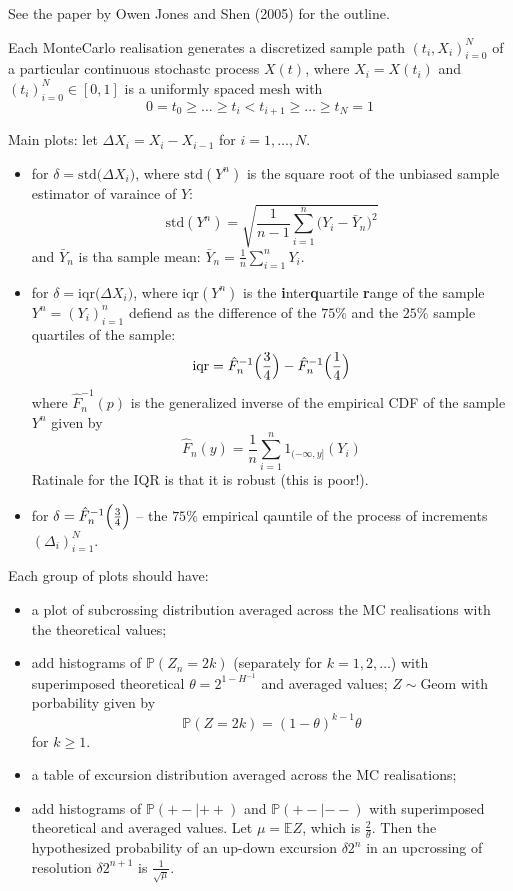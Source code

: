 \documentclass[a4paper]{report}
\newcommand{\pr}{\mathbb{P}}
\newcommand{\ex}{\mathbb{E}}
\begin{document}
See the paper by Owen Jones and Shen (2005) for the outline.

Each MonteCarlo realisation generates a discretized sample path $(t_i, X_i)_{i=0}^N$ of
a particular continuous stochastc process $X(t)$, where $X_i = X(t_i)$ and $(t_i)_{i=0}^N\in [0,1]$
is a uniformly spaced mesh with
\[0 = t_0 \geq \ldots \geq t_i < t_{i+1} \geq \ldots \geq t_N = 1\]

Main plots: let $\Delta X_i = X_i - X_{i-1}$ for $i=1,\ldots, N$.
\begin{itemize}
	\item for $\delta = \text{std}\bigl(\Delta X_i \bigr)$, where $\text{std}(Y^n)$ is
	the square root of the unbiased sample estimator of varaince of $Y$:
	\[ \text{std}(Y^n) = \sqrt{ \frac{1}{n-1} \sum_{i=1}^n \bigl( Y_i - \bar{Y}_n \bigr)^2 }\]
	and $\bar{Y}_n$ is tha sample mean: $\bar{Y}_n = \frac{1}{n}\sum_{i=1}^n Y_i$. 

	\item for $\delta = \text{iqr}\bigl(\Delta X_i \bigr)$, where $\text{iqr}(Y^n)$ is
	the \textbf{i}nter\textbf{q}uartile \textbf{r}ange of the sample $Y^n = (Y_i)_{i=1}^n$
	defiend as the difference of the $75\%$ and the $25\%$ sample quartiles of the sample:
	\[\text{iqr} = \hat{F}^{-1}_n\Bigl(\frac{3}{4}\Bigr) - \hat{F}^{-1}_n\Bigl(\frac{1}{4}\Bigr)\]
	where $\hat{F}^{-1}_n(p)$ is the generalized inverse of the empirical CDF of the sample $Y^n$
	given by
	\[\hat{F}_n(y) = \frac{1}{n} \sum_{i=1}^n 1_{(-\infty,y]}(Y_i)\]
	Ratinale for the IQR is that it is robust (this is poor!).
	\item for $\delta = \hat{F}^{-1}_n\Bigl(\frac{3}{4}\Bigr)$ -- the $75\%$ empirical qauntile of
	the process of increments $(\Delta_i)_{i=1}^N$.
\end{itemize}

Each group of plots should have: \begin{itemize}
	\item a plot of subcrossing distribution averaged across the MC realisations with
	the theoretical values;
	\item add histograms of $\pr(Z_n = 2k)$ (separately for $k=1,2,\ldots$) with
	superimposed theoretical $\theta = 2^{1-H^{-1}}$ and averaged values;
	$Z\sim\text{Geom}$ with porbability given by
	\[\pr(Z = 2k) = (1-\theta)^{k-1} \theta\]
	for $k\geq 1$.
	\item a table of excursion distribution averaged across the MC realisations;
	\item add histograms of $\pr(+-|++)$ and $\pr(+-|--)$ with superimposed theoretical
	and averaged values. Let $\mu = \ex Z$, which is $\frac{2}{\theta}$. Then the
	hypothesized probability of an up-down excursion $\delta 2^n$ in an upcrossing
	of resolution $\delta 2^{n+1}$ is $\frac{1}{\sqrt{\mu}}$.
\end{itemize}
\end{document}
